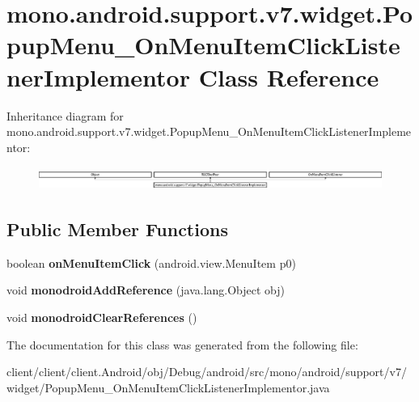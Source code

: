 \hypertarget{classmono_1_1android_1_1support_1_1v7_1_1widget_1_1PopupMenu__OnMenuItemClickListenerImplementor}{}\section{mono.\+android.\+support.\+v7.\+widget.\+Popup\+Menu\+\_\+\+On\+Menu\+Item\+Click\+Listener\+Implementor Class Reference}
\label{classmono_1_1android_1_1support_1_1v7_1_1widget_1_1PopupMenu__OnMenuItemClickListenerImplementor}
Inheritance diagram for mono.\+android.\+support.\+v7.\+widget.\+Popup\+Menu\+\_\+\+On\+Menu\+Item\+Click\+Listener\+Implementor\+:\begin{figure}[H]
\begin{center}
\leavevmode
\includegraphics[height=0.760353cm]{classmono_1_1android_1_1support_1_1v7_1_1widget_1_1PopupMenu__OnMenuItemClickListenerImplementor}
\end{center}
\end{figure}
\subsection*{Public Member Functions}
\begin{DoxyCompactItemize}
\item 
\hypertarget{classmono_1_1android_1_1support_1_1v7_1_1widget_1_1PopupMenu__OnMenuItemClickListenerImplementor_a62249f352c854b62e49a42bc6ea79c70}{}boolean {\bfseries on\+Menu\+Item\+Click} (android.\+view.\+Menu\+Item p0)\label{classmono_1_1android_1_1support_1_1v7_1_1widget_1_1PopupMenu__OnMenuItemClickListenerImplementor_a62249f352c854b62e49a42bc6ea79c70}

\item 
\hypertarget{classmono_1_1android_1_1support_1_1v7_1_1widget_1_1PopupMenu__OnMenuItemClickListenerImplementor_a10bc60fb24f62110461d25542b950567}{}void {\bfseries monodroid\+Add\+Reference} (java.\+lang.\+Object obj)\label{classmono_1_1android_1_1support_1_1v7_1_1widget_1_1PopupMenu__OnMenuItemClickListenerImplementor_a10bc60fb24f62110461d25542b950567}

\item 
\hypertarget{classmono_1_1android_1_1support_1_1v7_1_1widget_1_1PopupMenu__OnMenuItemClickListenerImplementor_afb02baf1ac72557754370a95de87f423}{}void {\bfseries monodroid\+Clear\+References} ()\label{classmono_1_1android_1_1support_1_1v7_1_1widget_1_1PopupMenu__OnMenuItemClickListenerImplementor_afb02baf1ac72557754370a95de87f423}

\end{DoxyCompactItemize}


The documentation for this class was generated from the following file\+:\begin{DoxyCompactItemize}
\item 
client/client/client.\+Android/obj/\+Debug/android/src/mono/android/support/v7/widget/Popup\+Menu\+\_\+\+On\+Menu\+Item\+Click\+Listener\+Implementor.\+java\end{DoxyCompactItemize}
